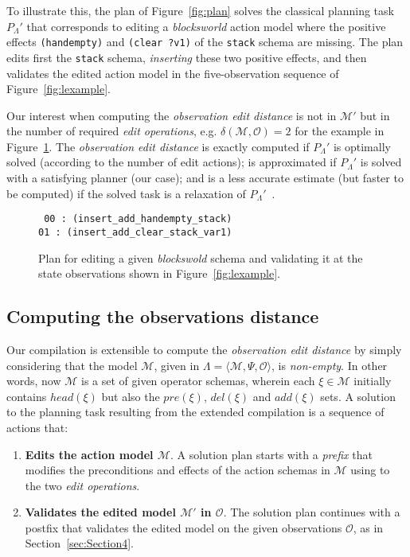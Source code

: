 \documentclass[3p,times]{elsarticle}
\newcommand{\tup}[1]{{\langle #1 \rangle}}
\begin{document}
To illustrate this, the plan of Figure~\ref{fig:plan} solves the classical planning task $P_{\Lambda}'$ that corresponds to editing a \emph{blocksworld} action model where the positive effects {\tt\small (handempty)} and {\tt\small (clear ?v1)} of the {\tt\small stack} schema are missing. The plan edits first the {\tt\small stack} schema, {\em inserting} these two positive effects, and then validates the edited action model in the five-observation sequence of Figure~\ref{fig:lexample}.

Our interest when computing the {\em observation edit distance} is not in $\mathcal{M}'$ but in the number of required {\em edit operations}, e.g. $\delta(\mathcal{M},\mathcal{O})=2$ for the example in Figure~\ref{fig:plan-edistance}. The {\em observation edit distance} is exactly computed if $P_{\Lambda}'$ is optimally solved (according to the number of edit actions); is approximated if $P_{\Lambda}'$ is solved with a satisfying planner (our case); and is a less accurate estimate (but faster to be computed) if the solved task is a relaxation of $P_{\Lambda}'$~\cite{bonet2001planning}.

\begin{figure}[hbt!]
{\tt\small
00 : (insert\_add\_handempty\_stack)\\
01 : (insert\_add\_clear\_stack\_var1)
}
 \caption{\small Plan for editing a given {\em blockswold} schema and validating it at the state observations shown in Figure~\ref{fig:lexample}.}
\label{fig:plan-edistance}
\end{figure}


\subsection{Computing the observations distance}

Our compilation is extensible to compute the {\em observation edit distance} by simply considering that the model $\mathcal{M}$, given in $\Lambda=\tup{\mathcal{M},\Psi,\mathcal{O}}$, is {\em non-empty}. In other words, now $\mathcal{M}$ is a set of given operator schemas, wherein each $\xi\in\mathcal{M}$ initially contains $head(\xi)$ but also the $pre(\xi)$, $del(\xi)$ and $add(\xi)$ sets. A solution to the planning task resulting from the extended compilation is a sequence of actions that:

\begin{enumerate}
\item {\bf Edits the action model $\mathcal{M}$}. A solution plan starts with a {\em prefix} that modifies the preconditions and effects of the action schemas in $\mathcal{M}$ using to the two {\em edit operations}.
\item {\bf Validates the edited model $\mathcal{M}'$ in $\mathcal{O}$}. The solution plan continues with a postfix that validates the edited model on the given observations $\mathcal{O}$, as in Section~\ref{sec:Section4}.
\end{enumerate}
\end{document}
